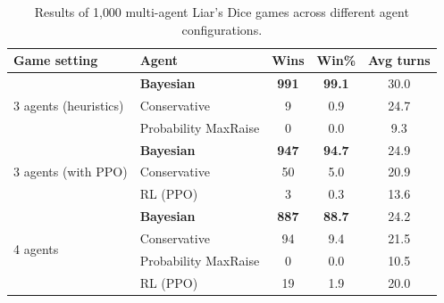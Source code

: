 \begin{table}[t]
\scriptsize
\centering
\begin{tabular}{llccc}
\toprule
Game setting & Agent & Wins & Win\% & Avg turns \\
\midrule
\multirow{3}{*}{3 agents (heuristics)}
 & \textbf{Bayesian} & \textbf{991} & \textbf{99.1} & 30.0 \\
 & Conservative & 9 & 0.9 & 24.7 \\
 & Probability MaxRaise & 0 & 0.0 & 9.3 \\
\midrule
\multirow{3}{*}{3 agents (with PPO)}
 & \textbf{Bayesian} & \textbf{947} & \textbf{94.7} & 24.9 \\
 & Conservative & 50 & 5.0 & 20.9 \\
 & RL (PPO) & 3 & 0.3 & 13.6 \\
\midrule
\multirow{4}{*}{4 agents}
 & \textbf{Bayesian} & \textbf{887} & \textbf{88.7} & 24.2 \\
 & Conservative & 94 & 9.4 & 21.5 \\
 & Probability MaxRaise & 0 & 0.0 & 10.5 \\
 & RL (PPO) & 19 & 1.9 & 20.0 \\
\bottomrule
\end{tabular}
\caption{Results of 1{,}000 multi-agent Liar's Dice games across different agent configurations.}
\label{tab:app_multi_agent_results}
\end{table}





